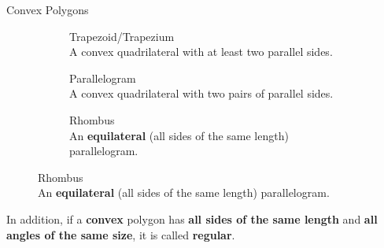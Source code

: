 \documentclass[final]{beamer}
\newlength{\colwidth}
\newcommand{\bfalert}[1]{\textbf{\alert{#1}}}
\begin{document}
\begin{frame}[t]
\begin{columns}[t]
\begin{column}{\colwidth}
\begin{block}{Convex Polygons}
\begin{figure}[H]
\begin{subfigure}[b]{.3\textwidth}
     \caption*{\alert{Trapezoid/Trapezium}\\ 
      A convex quadrilateral with at least two parallel sides.}
    \end{subfigure}
    \begin{subfigure}[b]{.3\textwidth}
     \caption*{\alert{Parallelogram}\\
      A convex quadrilateral with two pairs of parallel sides.}
    \end{subfigure}
    \begin{subfigure}[b]{.3\textwidth}
     \caption*{\alert{Rhombus}\\
     An \textbf{equilateral} (all sides of the same length) parallelogram.}
    \end{subfigure}
   \end{figure}

   In addition, if a \textbf{convex} polygon has \textbf{all sides of the same
   length} and \textbf{all angles of the same size}, it is called
   \bfalert{regular}.
   \begin{figure}[H]
    \captionsetup{justification=centering}
    \centering
    \begin{subfigure}[t]{.24\textwidth}
     \centering
\end{subfigure}
\end{figure}
\end{block}
\end{column}
\end{columns}
\end{frame}
\end{document}
